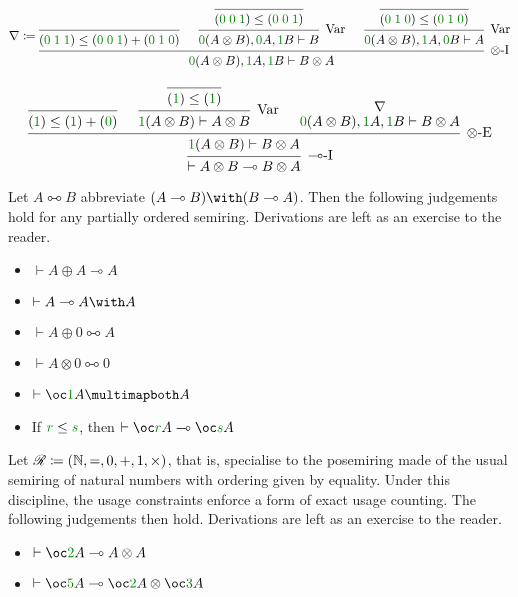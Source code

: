 \begin{small}
  \[
    \nabla \coloneqq
    \begin{prooftree}
      \infer0{\plr{\gr0\;\gr1\;\gr1} \leq
        \plr{\gr0\;\gr0\;\gr1} + \plr{\gr0\;\gr1\;\gr0}}
      \infer0{\plr{\gr0\;\gr0\;\gr1} \leq \plr{\gr0\;\gr0\;\gr1}}
      \infer1[Var]{\gr0\plr{A \otimes B}, \gr0A, \gr1B \vdash B}
      \infer0{\plr{\gr0\;\gr1\;\gr0} \leq \plr{\gr0\;\gr1\;\gr0}}
      \infer1[Var]{\gr0\plr{A \otimes B}, \gr1A, \gr0B \vdash A}
      \infer3[$\otimes$-I]%
      {\gr0\plr{A \otimes B}, \gr1A, \gr1B \vdash B \otimes A}
    \end{prooftree}
  \]

  \[
    \begin{prooftree}
      \infer0{\plr{\gr1} \leq \plr{\gr1} + \plr{\gr0}}
      \infer0{\plr{\gr1} \leq \plr{\gr1}}
      \infer1[Var]{\gr1\plr{A \otimes B} \vdash A \otimes B}
      \hypo{\nabla}
      \infer[no rule]1{\gr0\plr{A \otimes B}, \gr1A, \gr1B \vdash B \otimes A}
      \infer3[$\otimes$-E]{\gr1\plr{A \otimes B} \vdash B \otimes A}
      \infer1[$\multimap$-I]{\vdash A \otimes B \multimap B \otimes A}
    \end{prooftree}
  \]
\end{small}

\begin{example}
  Let $A \multimapboth B$ abbreviate
  $\plr{A \multimap B} \with \plr{B \multimap A}$.
  Then the following judgements hold for any partially ordered semiring.
  Derivations are left as an exercise to the reader.
  \begin{itemize}
    \item $\vdash A \oplus A \multimap A$
    \item $\vdash A \multimap A \with A$
    \item $\vdash A \oplus 0 \multimapboth A$
    \item $\vdash A \otimes 0 \multimapboth 0$
    \item $\vdash \oc\gr1A \multimapboth A$
    \item If $\gr r \leq \gr s$, then $\vdash \oc\gr rA \multimap \oc\gr sA$
  \end{itemize}
\end{example}

\begin{example}
  Let $\mathscr R \coloneqq (\mathbb N, =, 0, +, 1, \times)$, that is, specialise to
  the posemiring made of
  the usual semiring of natural numbers with ordering given by equality.
  Under this discipline, the usage constraints enforce a form of exact usage
  counting.
  The following judgements then hold.
  Derivations are left as an exercise to the reader.
  \begin{itemize}
    \item $\vdash \oc\gr2A \multimap A \otimes A$
    \item $\vdash \oc\gr5A \multimap \oc\gr2A \otimes \oc\gr3A$
  \end{itemize}
\end{example}

